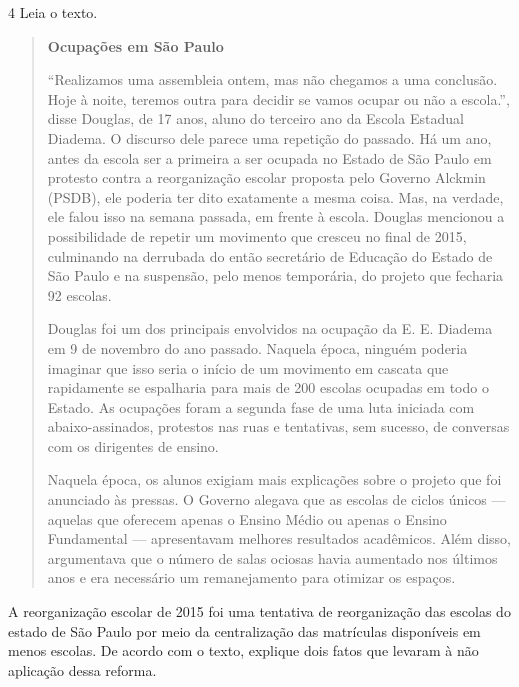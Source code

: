\num{4} Leia o texto.

\begin{quote}
\textbf{Ocupações em São Paulo}

``Realizamos uma assembleia ontem, mas não chegamos a uma conclusão.
Hoje à noite, teremos outra para decidir se vamos ocupar ou não a
escola.'', disse Douglas, de 17 anos, aluno do terceiro ano da Escola
Estadual Diadema. O discurso dele parece uma repetição do passado. Há um
ano, antes da escola ser a primeira a ser ocupada no Estado de São Paulo
em protesto contra a reorganização escolar proposta pelo Governo Alckmin
(PSDB), ele poderia ter dito exatamente a mesma coisa. Mas, na verdade,
ele falou isso na semana passada, em frente à escola. Douglas mencionou
a possibilidade de repetir um movimento que cresceu no final de 2015,
culminando na derrubada do então secretário de Educação do Estado de São
Paulo e na suspensão, pelo menos temporária, do projeto que fecharia 92
escolas.

Douglas foi um dos principais envolvidos na ocupação da E. E. Diadema em
9 de novembro do ano passado. Naquela época, ninguém poderia imaginar
que isso seria o início de um movimento em cascata que rapidamente se
espalharia para mais de 200 escolas ocupadas em todo o Estado. As
ocupações foram a segunda fase de uma luta iniciada com
abaixo-assinados, protestos nas ruas e tentativas, sem sucesso, de
conversas com os dirigentes de ensino.

Naquela época, os alunos exigiam mais explicações sobre o projeto que
foi anunciado às pressas. O Governo alegava que as escolas de ciclos
únicos --- aquelas que oferecem apenas o Ensino Médio ou apenas o Ensino
Fundamental --- apresentavam melhores resultados acadêmicos. Além disso,
argumentava que o número de salas ociosas havia aumentado nos últimos
anos e era necessário um remanejamento para otimizar os espaços.

\end{quote}

A reorganização escolar de 2015 foi uma tentativa de reorganização das
escolas do estado de São Paulo por meio da centralização das matrículas
disponíveis em menos escolas. De acordo com o texto, explique dois fatos
que levaram à não aplicação dessa reforma.


